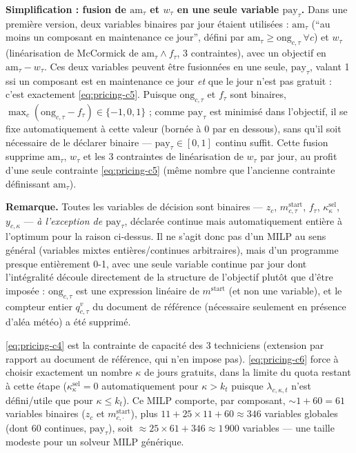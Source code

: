 \documentclass[11pt]{article}
\begin{document}
\textbf{Simplification : fusion de $\mathrm{am}_\tau$ et $w_\tau$ en une seule variable $\mathrm{pay}_\tau$.}
Dans une première version, deux variables binaires par jour étaient utilisées : $\mathrm{am}_\tau$
(``au moins un composant en maintenance ce jour'', défini par $\mathrm{am}_\tau\ge\mathrm{ong}_{c,\tau}\
\forall c$) et $w_\tau$ (linéarisation de McCormick de $\mathrm{am}_\tau\wedge f_\tau$, 3 contraintes),
avec un objectif en $\mathrm{am}_\tau-w_\tau$. Ces deux variables peuvent être fusionnées en une seule,
$\mathrm{pay}_\tau$, valant 1 ssi un composant est en maintenance ce jour \emph{et} que le jour n'est pas
gratuit : c'est exactement \eqref{eq:pricing-c5}. Puisque $\mathrm{ong}_{c,\tau}$ et $f_\tau$ sont binaires,
$\max_c(\mathrm{ong}_{c,\tau}-f_\tau)\in\{-1,0,1\}$ ; comme $\mathrm{pay}_\tau$ est minimisé dans
l'objectif, il se fixe automatiquement à cette valeur (bornée à 0 par en dessous), sans qu'il soit
nécessaire de le déclarer binaire --- $\mathrm{pay}_\tau\in[0,1]$ continu suffit. Cette fusion supprime
$\mathrm{am}_\tau$, $w_\tau$ et les 3 contraintes de linéarisation de $w_\tau$ par jour, au profit d'une
seule contrainte \eqref{eq:pricing-c5} (même nombre que l'ancienne contrainte définissant
$\mathrm{am}_\tau$).

\textbf{Remarque.} Toutes les variables de décision sont binaires --- $z_c$, $m^{\text{start}}_{c,\tau}$,
$f_\tau$, $\kappa^{\text{sel}}_\kappa$, $y_{c,\kappa}$ --- \emph{à l'exception de $\mathrm{pay}_\tau$},
déclarée continue mais automatiquement entière à l'optimum pour la raison ci-dessus. Il ne s'agit donc pas
d'un MILP au sens général (variables mixtes entières/continues arbitraires), mais d'un programme presque
entièrement 0-1, avec une seule variable continue par jour dont l'intégralité découle directement de la
structure de l'objectif plutôt que d'être imposée : $\mathrm{ong}_{c,\tau}$ est une expression linéaire de
$m^{\text{start}}$ (et non une variable), et le compteur entier $q^v_{c,\tau}$ du document de référence
(nécessaire seulement en présence d'aléa météo) a été supprimé.

\eqref{eq:pricing-c4} est la contrainte de capacité des 3 techniciens (extension par rapport au document
de référence, qui n'en impose pas). \eqref{eq:pricing-c6} force à choisir exactement un nombre $\kappa$ de
jours gratuits, dans la limite du quota restant à cette étape ($\kappa^{\text{sel}}_\kappa=0$
automatiquement pour $\kappa>k_t$ puisque $\lambda_{c,\kappa,t}$ n'est défini/utile que pour $\kappa\le
k_t$). Ce MILP comporte, par composant, $\sim\!1+60=61$ variables binaires ($z_c$ et $m^{\text{start}}_{c,
\cdot}$), plus $11+25\times11+60\approx346$ variables globales (dont 60 continues, $\mathrm{pay}_\tau$),
soit $\approx 25\times61+346\approx 1\,900$ variables --- une taille modeste pour un solveur MILP générique.
\end{document}
